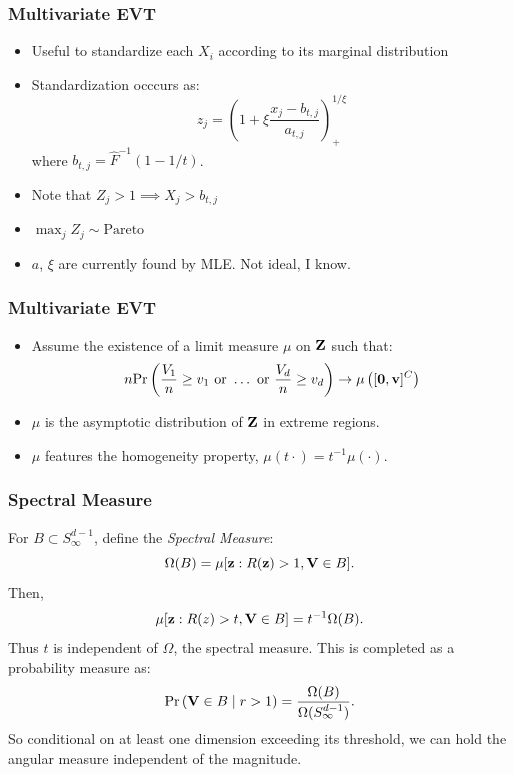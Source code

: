 \documentclass[aspectratio=169]{beamer}
\begin{document}
\begin{frame}
  \frametitle{Multivariate EVT}
  \begin{itemize}
    \item Useful to standardize each $X_i$ according to its marginal distribution
    \item Standardization occcurs as:
      \begin{equation}
        z_j = \left(1 + \xi\frac{x_j - b_{t,j}}{a_{t,j}}\right)_{+}^{1/\xi}
      \end{equation}
			where $b_{t,j} = \hat{F}^{-1}(1 - 1/t)$.
    \item Note that $Z_j > 1\implies X_j > b_{t,j}$
    \item $\max_j Z_j \sim \text{Pareto}$
		\item $a$, $\xi$ are currently found by MLE.  Not ideal, I know.
  \end{itemize}
\end{frame}

\begin{frame}
  \frametitle{Multivariate EVT}
  \begin{itemize}
    \item Assume the existence of a limit measure $\mu$ on ${\bf Z}$ such that:
    \begin{equation*}
      n\text{Pr}\left(\frac{V_1}{n} \geq v_1 \text{ or }\ldots\text{ or }\frac{V_d}{n}\geq v_d\right)
      \rightarrow \mu\left([{\bf 0}, {\bf v}]^C\right)
    \end{equation*}
    \item $\mu$ is the asymptotic distribution of ${\bf Z}$ in extreme regions.
    \item $\mu$ features the homogeneity property, $\mu(t\cdot) = t^{-1}\mu(\cdot)$.
  \end{itemize}
\end{frame}

\begin{frame}
  \frametitle{Spectral Measure}
  For $B \subset S_{\infty}^{d-1}$, define the \emph{Spectral Measure}:
  \begin{equation*}
    \Omega(B) = \mu[{\bf z}: R({\bf z}) > 1, {\bf V} \in B].
  \end{equation*}
  Then,
  \begin{equation*}
    \mu[{\bf z}:R(z)>t, {\bf V}\in B] = t^{-1}\Omega(B).
  \end{equation*}
  Thus $t$ is independent of $\Omega$, the spectral measure.  This is completed as a
    probability measure as:
  \begin{equation*}
    \text{Pr}\left({\bf V} \in B \mid r > 1\right) = \frac{\Omega(B)}{\Omega(S_{\infty}^{d-1})}.
  \end{equation*}
  So conditional on at least one dimension exceeding its threshold, we can hold the
  angular measure independent of the magnitude.
\end{frame}
\end{document}
